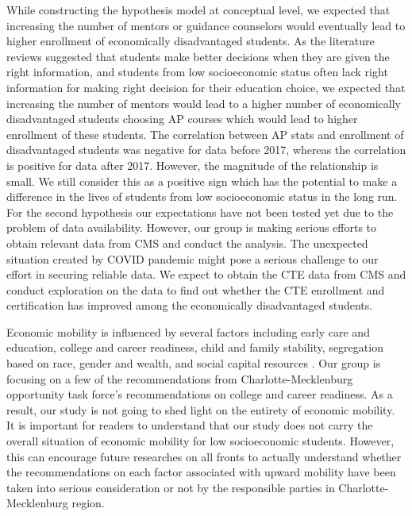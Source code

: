 While constructing the hypothesis model at conceptual level, we expected that increasing the number of mentors or guidance counselors would eventually lead to higher enrollment of economically disadvantaged students. 
As the literature reviews suggested that students make better decisions when they are given the right information, and students from low socioeconomic status often lack right information for making right decision for their education choice,  we expected that increasing the number of  mentors would lead to a higher number of economically disadvantaged students choosing AP courses which would lead to higher enrollment of these students. The correlation between AP stats and enrollment of disadvantaged students was negative for data before 2017, whereas the correlation is positive for data after 2017. However, the magnitude of the relationship is small. We still  consider this as a positive sign which has the potential to make a difference in the lives of students from low socioeconomic status in the long run. For the second hypothesis our expectations have not been tested yet due to the problem of data availability. However, our group is making serious efforts to obtain relevant data from CMS and conduct the analysis. The unexpected situation created by COVID pandemic might pose a serious challenge to our effort in securing reliable data. We expect to obtain the CTE data from CMS and conduct exploration on the data to find out whether the CTE enrollment and certification has improved among the economically disadvantaged students. 

Economic mobility is influenced by several factors including early care and education, college and career readiness, child and family stability, segregation based on race, gender and wealth, and social capital resources \parencite[][p. 3]{LOO}. 
Our group is focusing on a  few of the recommendations from Charlotte-Mecklenburg opportunity task force's recommendations on college and career readiness. As a result, our study is not going to shed light on the entirety of economic mobility. 
It is important for readers to understand that our study does not carry the overall situation of economic mobility for low socioeconomic students. 
However, this can encourage future researches on all fronts to actually understand whether the recommendations on each factor associated with upward mobility have been taken into serious consideration or not by the responsible parties in Charlotte-Mecklenburg region.

